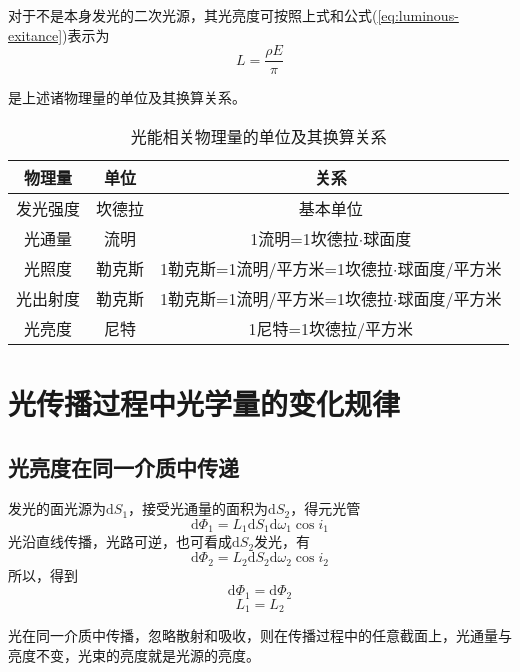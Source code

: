 \documentclass[cn,10pt,chinesefont=founder,math=newtx,cite=super,twoside]{elegantbook}
\begin{document}
对于不是本身发光的二次光源，其光亮度可按照上式和公式(\ref{eq:luminous-exitance})表示为
\begin{equation}
L=\frac{\rho E}{\pi}
\end{equation}

 是上述诸物理量的单位及其换算关系。
\begin{table}[htbp]
	\centering
	\caption{光能相关物理量的单位及其换算关系}
	\begin{tabular}{ccc}
		\toprule
		物理量  & 单位  & 关系  \\
		\midrule
		发光强度 & 坎德拉 & 基本单位  \\
		光通量  & 流明  & 1流明=1坎德拉$\cdot$球面度  \\
		光照度  & 勒克斯 & 1勒克斯=1流明/平方米=1坎德拉$\cdot$球面度/平方米 \\
		光出射度 & 勒克斯 & 1勒克斯=1流明/平方米=1坎德拉$\cdot$球面度/平方米 \\
		光亮度  & 尼特  & 1尼特=1坎德拉/平方米 \\
		\bottomrule
	\end{tabular}
    \label{tab:optical-energy-physical-quantity}
\end{table}


\section{光传播过程中光学量的变化规律}
\subsection{光亮度在同一介质中传递}
发光的面光源为$\mathrm{d}S_1$，接受光通量的面积为$\mathrm{d}S_2$，得元光管
\begin{equation}
\mathrm{d}\varPhi_1=L_1\mathrm{d}S_1\mathrm{d}\omega_1\cos i_1
\end{equation}
光沿直线传播，光路可逆，也可看成$\mathrm{d}S_2$发光，有
\begin{equation}
\mathrm{d}\varPhi_2=L_2\mathrm{d}S_2\mathrm{d}\omega_2\cos i_2
\end{equation}
所以，得到
\begin{equation}
\mathrm{d}\varPhi_1=\mathrm{d}\varPhi_2
\end{equation}
\begin{equation}
L_1=L_2
\end{equation}
\begin{conclusion}
光在同一介质中传播，忽略散射和吸收，则在传播过程中的任意截面上，光通量与亮度不变，光束的亮度就是光源的亮度。
\end{conclusion}
\end{document}
